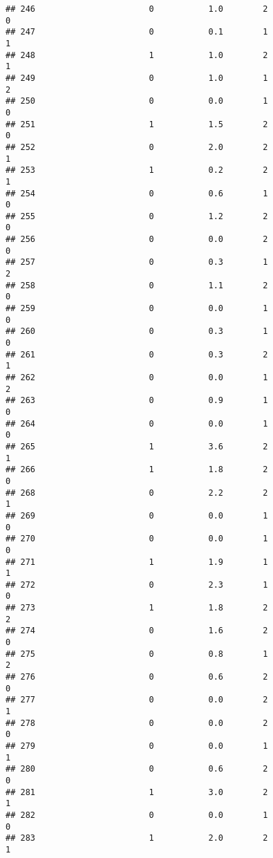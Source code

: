 \documentclass[]{article}
\begin{document}
\begin{verbatim}
## 246                       0           1.0        2                 0
## 247                       0           0.1        1                 1
## 248                       1           1.0        2                 1
## 249                       0           1.0        1                 2
## 250                       0           0.0        1                 0
## 251                       1           1.5        2                 0
## 252                       0           2.0        2                 1
## 253                       1           0.2        2                 1
## 254                       0           0.6        1                 0
## 255                       0           1.2        2                 0
## 256                       0           0.0        2                 0
## 257                       0           0.3        1                 2
## 258                       0           1.1        2                 0
## 259                       0           0.0        1                 0
## 260                       0           0.3        1                 0
## 261                       0           0.3        2                 1
## 262                       0           0.0        1                 2
## 263                       0           0.9        1                 0
## 264                       0           0.0        1                 0
## 265                       1           3.6        2                 1
## 266                       1           1.8        2                 0
## 268                       0           2.2        2                 1
## 269                       0           0.0        1                 0
## 270                       0           0.0        1                 0
## 271                       1           1.9        1                 1
## 272                       0           2.3        1                 0
## 273                       1           1.8        2                 2
## 274                       0           1.6        2                 0
## 275                       0           0.8        1                 2
## 276                       0           0.6        2                 0
## 277                       0           0.0        2                 1
## 278                       0           0.0        2                 0
## 279                       0           0.0        1                 1
## 280                       0           0.6        2                 0
## 281                       1           3.0        2                 1
## 282                       0           0.0        1                 0
## 283                       1           2.0        2                 1

\end{verbatim}
\end{document}
